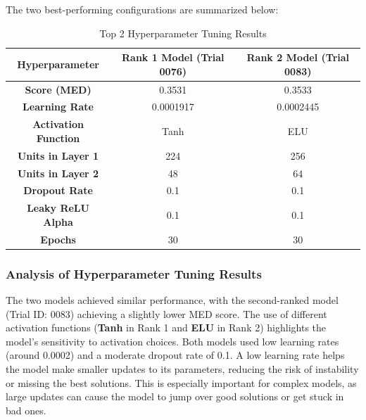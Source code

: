 The two best-performing configurations are summarized below:

\begin{table}[H]
\centering
\caption{Top 2 Hyperparameter Tuning Results}
\label{tab:hyperparameter_tuning_results}
\begin{tabular}{|c|c|c|}
\hline
\textbf{Hyperparameter}       & \textbf{Rank 1 Model (Trial 0076)} & \textbf{Rank 2 Model (Trial 0083)} \\ \hline
\textbf{Score (MED)}          & 0.3531                            & 0.3533                            \\ \hline
\textbf{Learning Rate}        & 0.0001917                         & 0.0002445                         \\ \hline
\textbf{Activation Function}  & Tanh                              & ELU                                \\ \hline
\textbf{Units in Layer 1}     & 224                               & 256                               \\ \hline
\textbf{Units in Layer 2}     & 48                                & 64                                \\ \hline
\textbf{Dropout Rate}         & 0.1                               & 0.1                               \\ \hline
\textbf{Leaky ReLU Alpha}     & 0.1                               & 0.1                               \\ \hline
\textbf{Epochs}               & 30                                & 30                                \\ \hline

\end{tabular}
\end{table}



\subsubsection{Analysis of  Hyperparameter Tuning Results}
The two models achieved similar performance, with the second-ranked model (Trial ID: 0083) achieving a slightly lower MED score. The use of different activation functions (\textbf{Tanh} in Rank 1 and \textbf{ELU} in Rank 2) highlights the model's sensitivity to activation choices. Both models used low learning rates (around 0.0002) and a moderate dropout rate of 0.1. A low learning rate helps the model make smaller updates to its parameters, reducing the risk of instability or missing the best solutions. This is especially important for complex models, as large updates can cause the model to jump over good solutions or get stuck in bad ones.


